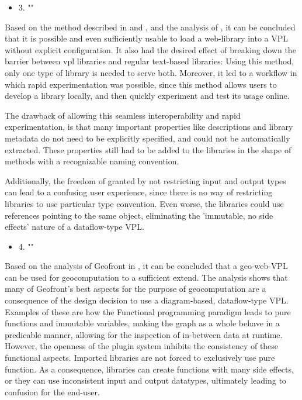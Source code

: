 \begin{itemize}[ ]
  \item 3. "\mySubRQThree"
\end{itemize}

Based on the method described in  and , and the analysis of , it can be concluded that it is possible and even sufficiently usable to load a web-library into a VPL without explicit configuration. 
It also had the desired effect of breaking down the barrier between vpl libraries and regular text-based libraries: Using this method, only one type of library is needed to serve both. 
Moreover, it led to a workflow in which rapid experimentation was possible, since this method allows users to develop a library locally, and then quickly experiment and test its usage online. 

The drawback of allowing this seamless interoperability and rapid experimentation, is that many important properties like descriptions and library metadata do not need to be explicitly specified, and could not be automatically extracted. 
These properties still had to be added to the libraries in the shape of methods with a recognizable naming convention.

Additionally, the freedom of granted by not restricting input and output types can lead to a confusing user experience, since there is no way of restricting libraries to use particular type convention.
Even worse, the libraries could use references pointing to the same object, eliminating the 'immutable, no side effects' nature of a dataflow-type VPL.

\begin{itemize}[ ]
  \item 4. "\mySubRQFour"
\end{itemize}

Based on the analysis of Geofront in , it can be concluded that a geo-web-VPL can be used for geocomputation to a sufficient extend.  
The analysis shows that many of Geofront's best aspects for the purpose of geocomputation are a consequence of the design decision to use a diagram-based, dataflow-type VPL.
Examples of these are how the Functional programming paradigm leads to pure functions and immutable variables, making the graph as a whole behave in a predicable manner, allowing for the inspection of in-between data at runtime. 
However, the openness of the plugin system inhibits the consistency of these functional aspects.
Imported libraries are not forced to exclusively use pure function. 
As a consequence, libraries can create functions with many side effects, or they can use inconsistent input and output datatypes, ultimately leading to confusion for the end-user.

